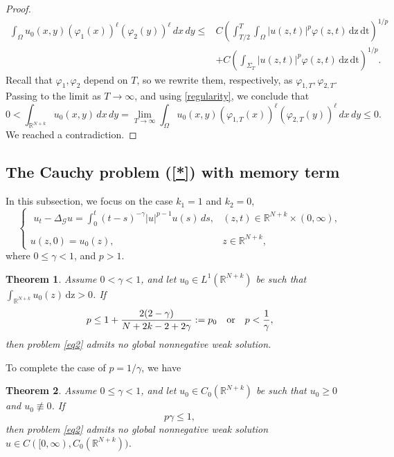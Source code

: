 \documentclass[reqno,11pt]{amsart}
\newtheorem{theorem}{Theorem}[section]
\numberwithin{equation}{section}
\def\R{{\mathbb {R}}}
\newcommand{\abs}[1]{\lvert#1\rvert}
\def\R{\mathbb{R}}
\begin{document}
\begin{proof}
\begin{align*}
		\int_{\Omega}u_0(x,y)\left(\varphi_1(x)\right)^\ell \left(\varphi_2(y)\right)^\ell\,dx\,dy  \leq & C \left(\int_{T/2}^T\int_{\Omega}|u(z,t)|^{p}\varphi(z,t)\,\mathrm{dz}\,\mathrm{dt}\right)^{1/p} \\
		&+C\left(\int_{\Sigma_T}|u(z,t)|^{p}\varphi(z,t)\,\mathrm{dz}\,\mathrm{dt}\right)^{1/p}.
	\end{align*}
	Recall that $\varphi_1, \varphi_2$ depend on $T$, so we rewrite them, respectively, as $\varphi_{1,T}, \varphi_{2,T}$. Passing to the limit as $T\rightarrow\infty$, and using \eqref{regularity}, we conclude that
	\[
	0<\int_{\mathbb{R}^{N+k}}u_0(x,y)\,dx\,dy=\lim_{T\rightarrow\infty}\int_{\Omega}u_0(x,y)\left(\varphi_{1,T}(x)\right)^\ell \left(\varphi_{2,T}(y)\right)^\ell\,dx\,dy\leq 0.
	\]
	We reached a contradiction.
\end{proof}




\subsection{The Cauchy problem (\ref{*}) with memory term}
In this subsection, we focus on the case $k_1=1$ and $k_2=0$,
\begin{equation}\label{eq2}
	\left\{\begin{array}{ll}
		\,\, \displaystyle {u_{t}-\Delta_{\mathcal{G}}
			u =\int_0^t(t-s)^{-\gamma}\abs{u}^{p-1}u(s)\,ds,} &\displaystyle {(z,t)\in {\mathbb{R}}^{N+k}\times (0,\infty),}\\
		{}\\
		\displaystyle{u(z,0)=  u_0(z),\qquad\qquad}&\displaystyle{z\in {\mathbb{R}}^{N+k},}
	\end{array}
	\right.
\end{equation} 
where $0\leq \gamma<1$, and $p>1$.

\begin{theorem}\label{T2} Assume $0< \gamma<1$, and let $u_0\in L^1(\R^{N+k})$ be such that $\displaystyle \int_{\R^{N+k}}u_0(z)\,\mathrm{dz}>0$. If
	$$p\leq1+\frac{2(2-\gamma)}{N+2k-2+2\gamma}:=p_0\quad\hbox{or}\quad
	p<\frac{1}{\gamma},$$
	then problem \eqref{eq2} admits no global nonnegative weak solution.
\end{theorem}
To complete the case of $p=1/\gamma$, we have
\begin{theorem}\label{T3} Assume $0\leq \gamma<1$, and let $u_0\in C_0(\R^{N+k})$ be such that $u_0\geq0$ and $u_0\not\equiv0$. If
	$$p\gamma \leq 1,$$
	then problem \eqref{eq2} admits no global nonnegative weak solution $u\in C([0,\infty),C_0(\R^{N+k}))$.
\end{theorem}
\end{document}
